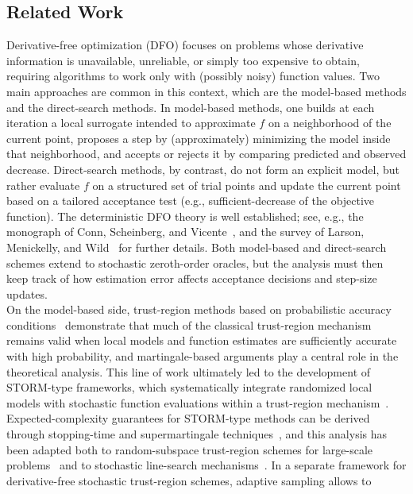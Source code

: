 \documentclass[11pt,a4paper]{article}
\begin{document}
\subsection{Related Work} \label{subsec:related_work}
Derivative-free optimization (DFO) focuses on  problems whose derivative information is unavailable, unreliable, or simply too expensive to obtain, requiring algorithms to work only with (possibly noisy) function values. Two main approaches are common in this context, which are the model-based methods and the direct-search methods. In model-based methods, one builds at each iteration a local surrogate  intended to approximate $f$ on a neighborhood of the current point, proposes a step by (approximately) minimizing the model inside that neighborhood, and accepts or rejects it by comparing predicted and observed decrease. Direct-search methods, by contrast, do not form an explicit model, but rather evaluate $f$ on a structured set of trial points 
and update the current point based on a tailored acceptance test (e.g., sufficient-decrease of the objective function).
The deterministic DFO theory is well established; see, e.g., the monograph of Conn, Scheinberg, and Vicente~\cite{MR2487816}, and the survey of Larson, Menickelly, and Wild~\cite{MR3963507} for further details. 
Both model-based and direct-search schemes extend to stochastic zeroth-order oracles, but the analysis must then keep track of how estimation error affects acceptance decisions and step-size updates.\\
On the model-based side, trust-region methods based on probabilistic accuracy conditions~\cite{MR3245880} demonstrate that much of the classical trust-region mechanism remains valid when local models and function estimates are sufficiently accurate with %
high probability, and martingale-based arguments play a central role in the theoretical analysis. This line of work ultimately led to the development of STORM-type frameworks, which systematically integrate randomized local models with stochastic function evaluations within a trust-region mechanism~\cite{MR3800867}. Expected-complexity guarantees for STORM-type methods can be derived through stopping-time and supermartingale techniques~\cite{MR4151319}, and this analysis has been adapted both to random-subspace trust-region schemes for large-scale problems~\cite{MR4777851} and to stochastic line-search mechanisms~\cite{MR4060460}. In a separate framework for derivative-free stochastic trust-region schemes, adaptive sampling allows to %
\end{document}
